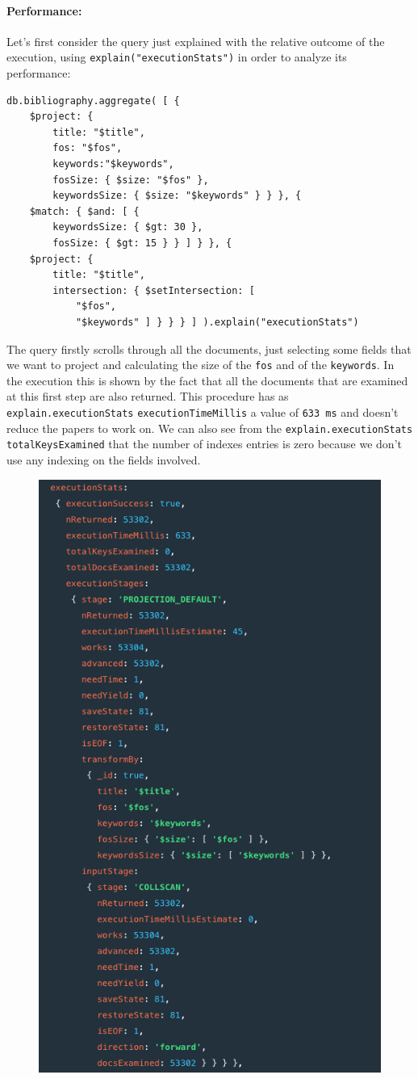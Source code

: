 \begin{enumerate}
    \paragraph{Performance:}
    Let's first consider the query just explained with the relative outcome of the execution, using \verb|explain("executionStats")| in order to analyze its performance:
    \begin{lstlisting}[label={lst:lstlisting66}]
db.bibliography.aggregate( [ {
    $project: {
        title: "$title",
        fos: "$fos",
        keywords:"$keywords",
        fosSize: { $size: "$fos" },
        keywordsSize: { $size: "$keywords" } } }, {
    $match: { $and: [ {
        keywordsSize: { $gt: 30 },
        fosSize: { $gt: 15 } } ] } }, {
    $project: {
        title: "$title",
        intersection: { $setIntersection: [
            "$fos",
            "$keywords" ] } } } ] ).explain("executionStats")
    \end{lstlisting}
    The query firstly scrolls through all the documents, just selecting some fields that we want to project and calculating the size of the \verb|fos| and of the \verb|keywords|.
    In the execution this is shown by the fact that all the documents that are examined at this first step are also returned.
    This procedure has as \verb|explain.executionStats| \verb|executionTimeMillis| a value of \verb|633 ms| and doesn't reduce the papers to work on.
    We can also see from the \verb|explain.executionStats| \verb|totalKeysExamined| that the number of indexes entries is zero because we don't use any indexing on the fields involved.
    \begin{figure}[H]
        \begin{center}
            \includegraphics[width=0.6\linewidth]{ImagesMongoDB/performanceV1}

\end{center}
\end{figure}
\end{enumerate}
